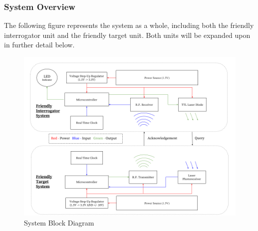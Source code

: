 \documentclass[letterpaper,10pt]{article}
\begin{document}
\begin{spacing}{1.15}
\subsubsection{System Overview}
The following figure represents the system as a whole, including both the friendly interrogator unit and the friendly target unit. Both units will be expanded upon in further detail below.
\begin{figure} [H]
	\centering
	\includegraphics[scale=0.45]{System_Block_Diagram.png}
	\caption{System Block Diagram\label{fig:system-block-diagram}}
\end{figure}


\end{spacing}
\end{document}
